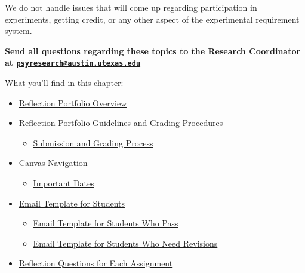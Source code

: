\documentclass[
]{article}
\providecommand{\tightlist}{%
  \setlength{\itemsep}{0pt}\setlength{\parskip}{0pt}}
\begin{document}
We do not handle issues that will come up regarding participation in experiments, getting credit, or any other aspect of the experimental requirement system.

\textbf{Send all questions regarding these topics to the Research Coordinator at \href{mailto:psyresearch@austin.utexas.edu}{\nolinkurl{psyresearch@austin.utexas.edu}}}

What you'll find in this chapter:

\begin{itemize}
\tightlist
\item
  \protect\hyperlink{reflection-portfolio-overview}{Reflection Portfolio Overview}\\
\item
  \protect\hyperlink{reflection-portfolio-guidelines-and-grading-procedures}{Reflection Portfolio Guidelines and Grading Procedures}

  \begin{itemize}
  \tightlist
  \item
    \protect\hyperlink{submission-and-grading-process}{Submission and Grading Process}\\
  \end{itemize}
\item
  \protect\hyperlink{canvas-navigation}{Canvas Navigation}

  \begin{itemize}
  \tightlist
  \item
    \protect\hyperlink{important-dates}{Important Dates}\\
  \end{itemize}
\item
  \protect\hyperlink{email-template-for-students}{Email Template for Students}

  \begin{itemize}
  \tightlist
  \item
    \protect\hyperlink{email-template-for-students-who-pass}{Email Template for Students Who Pass}\\
  \item
    \protect\hyperlink{email-template-for-students-who-need-revisions}{Email Template for Students Who Need Revisions}\\
  \end{itemize}
\item
  \protect\hyperlink{reflection-questions-for-each-assignment}{Reflection Questions for Each Assignment}


\end{itemize}
\end{document}
